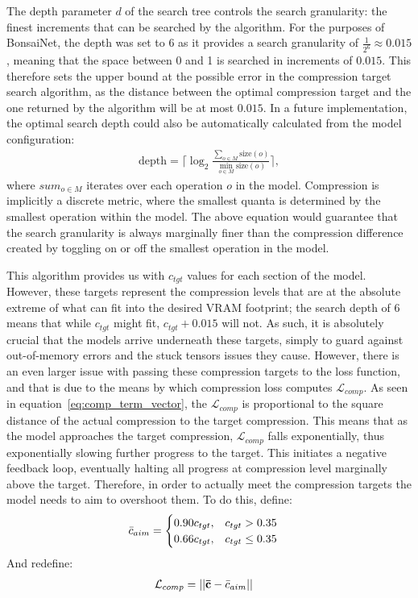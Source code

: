 \noindent The depth parameter $d$ of the search tree controls the search granularity: the finest increments that can be searched by
the algorithm. For the purposes of BonsaiNet, the depth was set to 6 as it provides a search granularity of $\frac{1}{2^6} \approx 0.015$,
meaning that the space between 0 and 1 is searched in increments of $0.015$. This therefore sets the upper bound at the
possible error in the compression target search algorithm, as the distance between the optimal compression target and the
one returned by the algorithm will be at most $0.015$. In a future implementation, the optimal search depth could also be
automatically calculated from the model configuration:
\begin{align}
	\text{depth} = \lceil \log_2 \frac{\sum_{o \in M} \text{size}(o)}{\min_{o \in M} \text{size}(o)} \rceil,
\end{align}
\noindent where $sum_{o \in M}$ iterates over each operation $o$ in the model. Compression is implicitly a discrete metric, where the smallest
quanta is determined by the smallest operation within the model. The above equation would guarantee that the search
granularity is always marginally finer than the compression difference created by toggling on or off the smallest operation in the model.

This algorithm provides us with $c_{tgt}$ values for each section of the model. However, these targets represent
the compression levels that are at the absolute extreme of what can fit into the desired VRAM footprint; the search
depth of 6 means that while $c_{tgt}$ might fit, $c_{tgt}+0.015$ will not. As such, it is absolutely crucial that the models
arrive underneath these targets, simply to guard against out-of-memory errors and the stuck tensors issues they cause.
However, there is an even larger issue with passing these compression targets to the loss function, and that is due to the
means by which compression loss computes $\mathcal{L}_{comp}$. As seen in equation~\ref{eq:comp_term_vector},
the $\mathcal{L}_{comp}$ is proportional to the square distance of the actual compression to the target compression. This means that
as the model approaches the target compression, $\mathcal{L}_{comp}$ falls exponentially, thus exponentially slowing further
progress to the target. This initiates a negative feedback loop, eventually halting all progress at compression level
marginally above the target. Therefore, in order to actually meet the compression targets the model needs to aim to
overshoot them. To do this, define:
\begin{align}
	\bar{c}_{aim} &= \begin{cases}
		0.90c_{tgt}, & c_{tgt} > 0.35\\
		0.66c_{tgt}, & c_{tgt} \le 0.35
	\end{cases} \label{eq:c_aim}
\end{align}
\noindent And redefine:
\begin{align}
	\mathcal{L}_{comp} &=  ||\mathbf{\bar{c}} - \bar{c}_{aim}|| \label{eq:comp_aim_term_vector}
\end{align}

